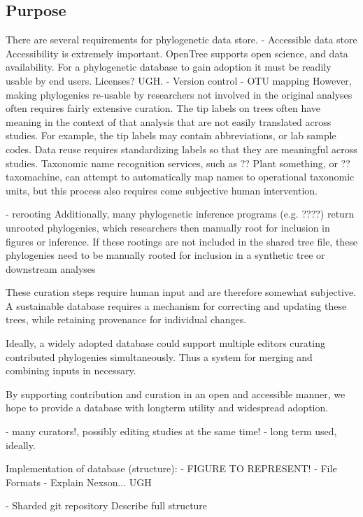 \documentclass[a4paper,10pt]{article}
\begin{document}
\subsection{Purpose}
There are several requirements for phylogenetic data store.
      - Accessible data store
Accessibility is extremely important.
OpenTree supports open science, and data availability.
For a phylogenetic database to gain adoption it must be readily usable by end users.
Licenses? UGH.
          - Version control
          - OTU mapping
However, making phylogenies re-usable by researchers not involved in the original analyses often requires fairly extensive curation.
The tip labels on trees often have meaning in the context of that analysis that are not easily translated across studies. 
For example, the tip labels may contain abbreviations, or lab sample codes.
Data reuse requires standardizing labels so that they are meaningful across studies.
Taxonomic name recognition services, such as ?? Plant something, or ?? taxomachine, can attempt to automatically map names to
operational taxonomic units, but this process also requires come subjective human intervention. 

          - rerooting
Additionally, many phylogenetic inference programs (e.g. ????) return unrooted phylogenies, 
which researchers then manually root for inclusion in figures or inference. 
If these rootings are not included in the shared tree file, 
these phylogenies need to be manually rooted for inclusion in a synthetic tree or downstream analyses

These curation steps require human input and are therefore somewhat subjective.
A sustainable database requires a mechanism for correcting and updating these trees,
while retaining provenance for individual changes.

Ideally, a widely adopted database could support multiple editors curating contributed phylogenies simultaneously.
Thus a system for merging and combining inputs in necessary.

By supporting contribution and curation in an open and accessible manner, we hope to provide a database with longterm utility and widespread adoption.

          - many curators!, possibly editing studies at the same time!
          - long term used, ideally.

           Implementation of database (structure):
      - FIGURE TO REPRESENT!
      - File Formats
         - Explain Nexson... UGH
         
      - Sharded git repository
          Describe full structure 
          
\end{document}
